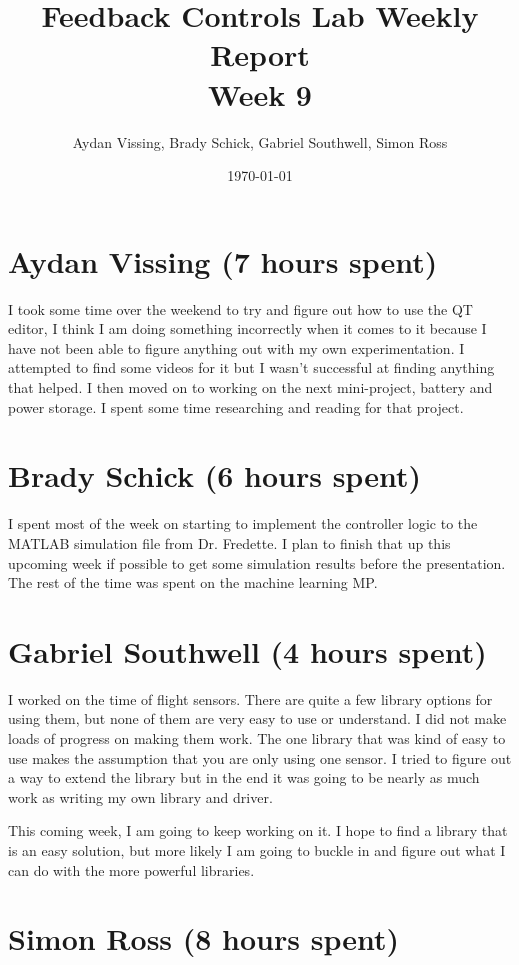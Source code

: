 \documentclass[12pt, titlepage]{article}
\title{Feedback Controls Lab Weekly Report \\ \normalsize{Week 9}}
\author{Aydan Vissing, Brady Schick, Gabriel Southwell, Simon Ross}
\date{\today}
\begin{document}
\maketitle

\section*{Aydan Vissing (7 hours spent)}

I took some time over the weekend to try and figure out how to use the QT editor, I think I am doing something incorrectly when it comes to it because I have not been able to figure anything out with my own experimentation. I attempted to find some videos for it but I wasn't successful at finding anything that helped. I then moved on to working on the next mini-project, battery and power storage. I spent some time researching and reading for that project. 

\section*{Brady Schick (6 hours spent)}

I spent most of the week on starting to implement the controller logic to the MATLAB simulation file from Dr. Fredette. I plan to finish that up this upcoming week if possible to get some simulation results before the presentation. The rest of the time was spent on the machine learning MP.

\section*{Gabriel Southwell (4 hours spent)}

I worked on the time of flight sensors. There are quite a few library options for using them, but none of them are very easy to use or understand. I did not make loads of progress on making them work. The one library that was kind of easy to use makes the assumption that you are only using one sensor. I tried to figure out a way to extend the library but in the end it was going to be nearly as much work as writing my own library and driver.

This coming week, I am going to keep working on it. I hope to find a library that is an easy solution, but more likely I am going to buckle in and figure out what I can do with the more powerful libraries.

\section*{Simon Ross (8 hours spent)}
\end{document}

